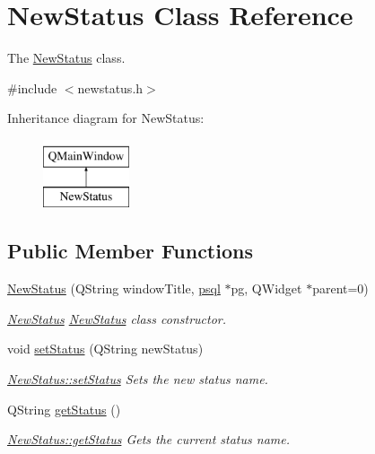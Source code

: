 \hypertarget{class_new_status}{}\section{New\+Status Class Reference}
\label{class_new_status}


The \hyperlink{class_new_status}{New\+Status} class.  




{\ttfamily \#include $<$newstatus.\+h$>$}

Inheritance diagram for New\+Status\+:\begin{figure}[H]
\begin{center}
\leavevmode
\includegraphics[height=2.000000cm]{class_new_status}
\end{center}
\end{figure}
\subsection*{Public Member Functions}
\begin{DoxyCompactItemize}
\item 
\hyperlink{class_new_status_a5a09743191f617f006bc89e4b35984bf}{New\+Status} (Q\+String window\+Title, \hyperlink{classpsql}{psql} $\ast$pg, Q\+Widget $\ast$parent=0)
\begin{DoxyCompactList}\small\item\em \hyperlink{class_new_status}{New\+Status} \hyperlink{class_new_status}{New\+Status} class constructor. \end{DoxyCompactList}\item 
void \hyperlink{class_new_status_a861326c3b5c45040b933e4e65a4646e2}{set\+Status} (Q\+String new\+Status)
\begin{DoxyCompactList}\small\item\em \hyperlink{class_new_status_a861326c3b5c45040b933e4e65a4646e2}{New\+Status\+::set\+Status} Sets the new status name. \end{DoxyCompactList}\item 
Q\+String \hyperlink{class_new_status_a7ea744ad1645c5954000983d50947154}{get\+Status} ()
\begin{DoxyCompactList}\small\item\em \hyperlink{class_new_status_a7ea744ad1645c5954000983d50947154}{New\+Status\+::get\+Status} Gets the current status name. \end{DoxyCompactList}\end{DoxyCompactItemize}


